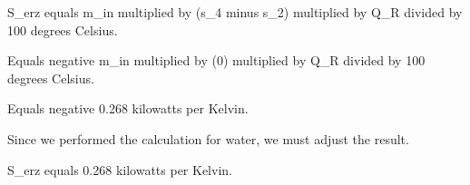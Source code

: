 S_erz equals m_in multiplied by (s_4 minus s_2) multiplied by Q_R divided by 100 degrees Celsius.  

Equals negative m_in multiplied by (0) multiplied by Q_R divided by 100 degrees Celsius.  

Equals negative 0.268 kilowatts per Kelvin.  

Since we performed the calculation for water, we must adjust the result.  

S_erz equals 0.268 kilowatts per Kelvin.